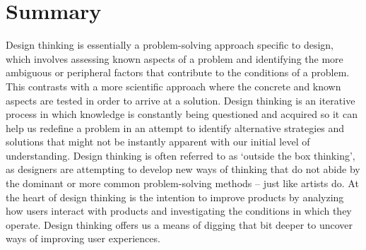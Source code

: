 \section{Summary} %
\label{sec:summary}
Design thinking is essentially a problem-solving approach specific to design, which involves assessing known aspects of a problem and identifying the more ambiguous or peripheral factors that contribute to the conditions of a problem. This contrasts with a more scientific approach where the concrete and known aspects are tested in order to arrive at a solution. Design thinking is an iterative process in which knowledge is constantly being questioned and acquired so it can help us redefine a problem in an attempt to identify alternative strategies and solutions that might not be instantly apparent with our initial level of understanding. Design thinking is often referred to as ‘outside the box thinking’, as designers are attempting to develop new ways of thinking that do not abide by the dominant or more common problem-solving methods – just like artists do. At the heart of design thinking is the intention to improve products by analyzing how users interact with products and investigating the conditions in which they operate. Design thinking offers us a means of digging that bit deeper to uncover ways of improving user experiences.

